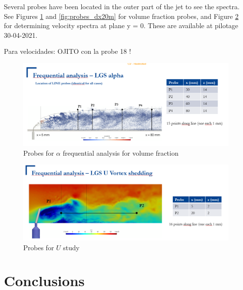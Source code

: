 Several probes have been located in the outer part of the jet to see the spectra. See Figures \ref{fig:probes_dx10m} and \ref{fig:probes_dx20m} for volume fraction probes, and Figure \ref{fig:probes_U_planey0} for determining velocity spectra at plane y = 0. These are available at pilotage 30-04-2021.

Para velocidades: OJITO con la probe 18 !

\begin{figure}[h!]
	\centering
	\includegraphics[scale=0.7]{./part2_developments/figures_ch6_lagrangian_JICF/probes_vol_frac}
	\caption{Probes for $\alpha$ frequential analysis for volume fraction}
	\label{fig:probes_dx10m}
\end{figure}


\begin{figure}[h!]
	\centering
	\includegraphics[scale=0.7]{./part2_developments/figures_ch6_lagrangian_JICF/probes_U_planey0}
	\caption{Probes for $U$ study}
	\label{fig:probes_U_planey0}
\end{figure}



\section{Conclusions}